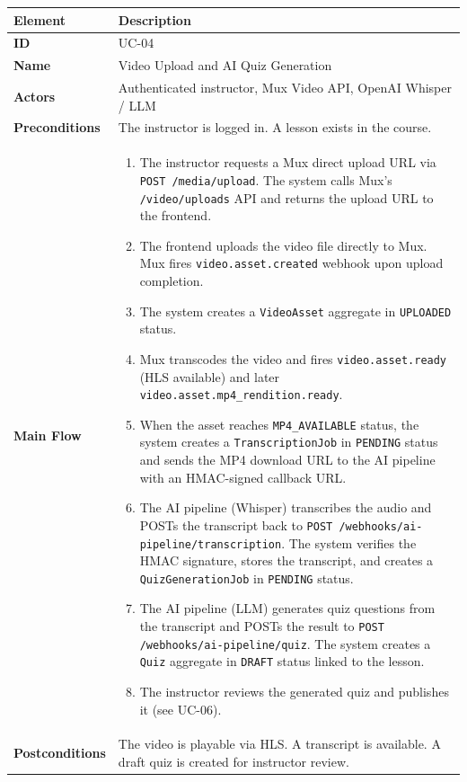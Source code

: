 \begin{longtable}{p{3cm}p{10cm}}
  \toprule
  \textbf{Element} & \textbf{Description} \\
  \midrule
  \endhead
  \midrule
  \endfoot
  \textbf{ID} & UC-04 \\
  \textbf{Name} & Video Upload and AI Quiz Generation \\
  \textbf{Actors} & Authenticated instructor, Mux Video API, OpenAI Whisper / LLM \\
  \textbf{Preconditions} & The instructor is logged in. A lesson exists in the course. \\
  \textbf{Main Flow} &
  \begin{enumerate}
    \item The instructor requests a Mux direct upload URL via \texttt{POST /media/upload}. The system calls Mux's \texttt{/video/uploads} API and returns the upload URL to the frontend.
    \item The frontend uploads the video file directly to Mux. Mux fires \texttt{video.asset.created} webhook upon upload completion.
    \item The system creates a \texttt{VideoAsset} aggregate in \texttt{UPLOADED} status.
    \item Mux transcodes the video and fires \texttt{video.asset.ready} (HLS available) and later \texttt{video.asset.mp4\_rendition.ready}.
    \item When the asset reaches \texttt{MP4\_AVAILABLE} status, the system creates a \texttt{TranscriptionJob} in \texttt{PENDING} status and sends the MP4 download URL to the AI pipeline with an HMAC-signed callback URL.
    \item The AI pipeline (Whisper) transcribes the audio and POSTs the transcript back to \texttt{POST /webhooks/ai-pipeline/transcription}. The system verifies the HMAC signature, stores the transcript, and creates a \texttt{QuizGenerationJob} in \texttt{PENDING} status.
    \item The AI pipeline (LLM) generates quiz questions from the transcript and POSTs the result to \texttt{POST /webhooks/ai-pipeline/quiz}. The system creates a \texttt{Quiz} aggregate in \texttt{DRAFT} status linked to the lesson.
    \item The instructor reviews the generated quiz and publishes it (see UC-06).
  \end{enumerate} \\
  \textbf{Postconditions} & The video is playable via HLS. A transcript is available. A draft quiz is created for instructor review. \\

\end{longtable}
